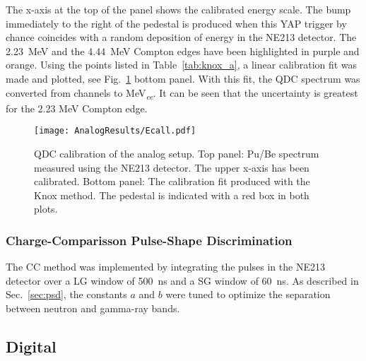 \documentclass[main.tex]{subfiles}
\begin{document}
The x-axis at the top of the panel shows the calibrated energy scale. The bump immediately to the right of the pedestal is produced when this YAP trigger by chance coincides with a random deposition of energy in the NE213 detector. The \SI{2.23}{MeV} and the \SI{4.44}{MeV} Compton edges have been highlighted in purple and orange. Using the points listed in Table~\ref{tab:knox_a}, a linear calibration fit was made and plotted, see Fig.~\ref{fig:qdc_a} bottom panel. With this fit, the QDC spectrum was converted from channels to \si{MeV_{\textit{ee}}}. It can be seen that the uncertainty is greatest for the 2.23 \si{\MeV} Compton edge.
\begin{figure}[ht!]
    \centering
        \texttt{[image: AnalogResults/Ecall.pdf]}
        \caption[QDC calibration of the analog setup.]{QDC calibration of the analog setup. Top panel: Pu/Be spectrum measured using the NE213 detector. The upper x-axis has been calibrated. Bottom panel: The calibration fit produced with the Knox method. The pedestal is indicated with a red box in both plots.}
    \label{fig:qdc_a}
\end{figure}

\subsubsection{Charge-Comparisson Pulse-Shape Discrimination}
The CC method was implemented by integrating the pulses in the NE213 detector over a LG window of \SI{500}{ns} and a SG window of \SI{60}{ns}. As described in Sec.~\ref{sec:psd}, the constants $a$ and $b$ were tuned to optimize the separation between neutron and gamma-ray bands.




\subsection{Digital}
\end{document}
